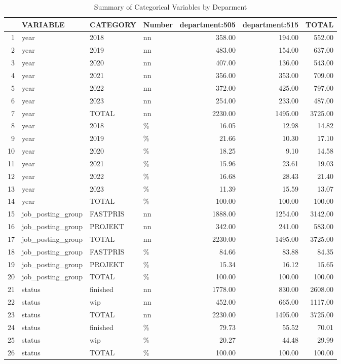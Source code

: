 \begin{sidewaystable}[ht]
\centering
\caption{Summary of Categorical Variables by Deparment} 
\begin{tabular}{rlllrrr}
  \hline
 & VARIABLE & CATEGORY & Number & department:505 & department:515 & TOTAL \\ 
  \hline
1 & year & 2018 & nn & 358.00 & 194.00 & 552.00 \\ 
  2 & year & 2019 & nn & 483.00 & 154.00 & 637.00 \\ 
  3 & year & 2020 & nn & 407.00 & 136.00 & 543.00 \\ 
  4 & year & 2021 & nn & 356.00 & 353.00 & 709.00 \\ 
  5 & year & 2022 & nn & 372.00 & 425.00 & 797.00 \\ 
  6 & year & 2023 & nn & 254.00 & 233.00 & 487.00 \\ 
  7 & year & TOTAL & nn & 2230.00 & 1495.00 & 3725.00 \\ 
  8 & year & 2018 & \% & 16.05 & 12.98 & 14.82 \\ 
  9 & year & 2019 & \% & 21.66 & 10.30 & 17.10 \\ 
  10 & year & 2020 & \% & 18.25 & 9.10 & 14.58 \\ 
  11 & year & 2021 & \% & 15.96 & 23.61 & 19.03 \\ 
  12 & year & 2022 & \% & 16.68 & 28.43 & 21.40 \\ 
  13 & year & 2023 & \% & 11.39 & 15.59 & 13.07 \\ 
  14 & year & TOTAL & \% & 100.00 & 100.00 & 100.00 \\ 
  15 & job\_posting\_group & FASTPRIS & nn & 1888.00 & 1254.00 & 3142.00 \\ 
  16 & job\_posting\_group & PROJEKT & nn & 342.00 & 241.00 & 583.00 \\ 
  17 & job\_posting\_group & TOTAL & nn & 2230.00 & 1495.00 & 3725.00 \\ 
  18 & job\_posting\_group & FASTPRIS & \% & 84.66 & 83.88 & 84.35 \\ 
  19 & job\_posting\_group & PROJEKT & \% & 15.34 & 16.12 & 15.65 \\ 
  20 & job\_posting\_group & TOTAL & \% & 100.00 & 100.00 & 100.00 \\ 
  21 & status & finished & nn & 1778.00 & 830.00 & 2608.00 \\ 
  22 & status & wip & nn & 452.00 & 665.00 & 1117.00 \\ 
  23 & status & TOTAL & nn & 2230.00 & 1495.00 & 3725.00 \\ 
  24 & status & finished & \% & 79.73 & 55.52 & 70.01 \\ 
  25 & status & wip & \% & 20.27 & 44.48 & 29.99 \\ 
  26 & status & TOTAL & \% & 100.00 & 100.00 & 100.00 \\ 
   \hline
\end{tabular}
\end{sidewaystable}
